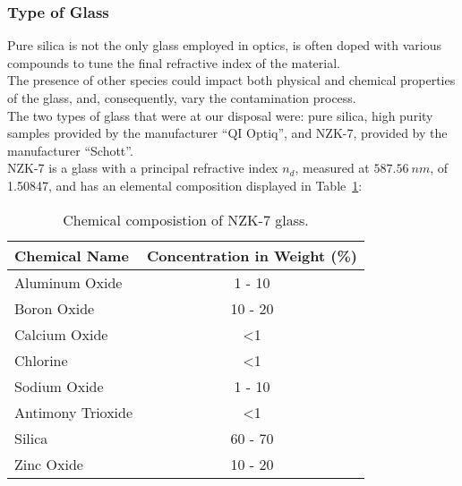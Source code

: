 \subsubsection{Type of Glass}
Pure silica is not the only glass employed in optics,  is often doped with various compounds to tune the final refractive index of the material.
\\
The presence of other species could impact both physical and chemical properties of the glass, and, consequently, vary the contamination process.
\\
The two types of glass that were at our disposal were: pure silica, high purity samples provided by the manufacturer “QI Optiq”, and NZK-7, provided by the manufacturer “Schott”. 
\\
NZK-7 is a glass with a principal refractive index $n_d$, measured at $587.56 \: nm$, of 1.50847, and has an elemental composition displayed in Table~\ref{table:nzk7_concentration}:



\begin{table}[H]
    \centering
\begin{tabular}{|l|c|}
\hline
Chemical Name     & Concentration in Weight (\%) \\ \hline
Aluminum Oxide    & 1 - 10                         \\ \hline
Boron Oxide       & 10 - 20                        \\ \hline
Calcium Oxide     & \textless 1                  \\ \hline
Chlorine          & \textless 1                  \\ \hline
Sodium Oxide      & 1 - 10                       \\ \hline
Antimony Trioxide & \textless 1                  \\ \hline
Silica            & 60 - 70                        \\ \hline
Zinc Oxide        & 10 - 20                        \\ \hline
\end{tabular}
\caption{Chemical composistion of NZK-7 glass. }
    \label{table:nzk7_concentration}
\end{table}

